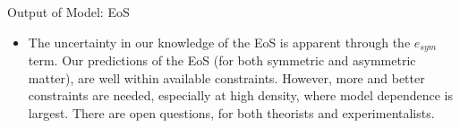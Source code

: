 \documentclass[serif]{beamer}
\begin{document}
\begin{frame}{}
\begin{columns}[t]
\begin{column}{0.32\paperwidth}
\begin{block}{Output of Model: EoS}
\begin{itemize}
\begin{figure}[H]
\begin{center}
\hspace{5cm}
\caption{ Plot of the EoS $e(\rho,\alpha)$ as a function of density. The black (dashed) curve is for $\alpha = 1$ while the red (solid) curve is for $\alpha = 0$.  Plot of $e_{sym}$ as a function of density. The red curve is the EoS as derived through DBHF predictions. The black curves are commonly used parameterizations.\label{eos_e_sym}}
\end{center}
\end{figure}
\item \alert{The uncertainty in our knowledge of the EoS is apparent through the $e_{sym}$ term}. Our predictions of the EoS (for both symmetric and asymmetric matter), are well within available constraints. However, more and better constraints are needed, especially at high density, where model dependence is largest. There are open questions, for both theorists and experimentalists.

\end{itemize}
\end{block}
\end{column}
\end{columns}
\end{frame}
\end{document}

